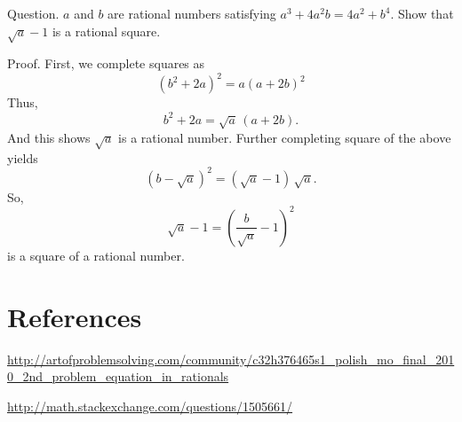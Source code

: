 \documentclass{article}
\begin{document}
Question.  $a$ and $b$ are rational numbers satisfying $a^3 + 4a^2 b = 4a^2 + b^4$.
Show that $\sqrt a - 1$ is a rational square.

Proof.  First, we complete squares as
$$
(b^2 + 2a)^2 = a (a + 2b)^2
$$
Thus,
$$
b^2 + 2 a = \sqrt a \, (a + 2 b).
$$
And this shows $\sqrt{a}$ is a rational number.  Further completing square of the above yields
$$
(b - \sqrt{a})^2 = (\sqrt{a} - 1) \, \sqrt{a}.
$$
So,
$$
\sqrt{a} - 1 = \left( \frac{b}{ \sqrt{a} } - 1\right)^2
$$
is a square of a rational number.


\section*{References}

\url{http://artofproblemsolving.com/community/c32h376465s1_polish_mo_final_2010_2nd_problem_equation_in_rationals}

\url{http://math.stackexchange.com/questions/1505661/}
\end{document}
